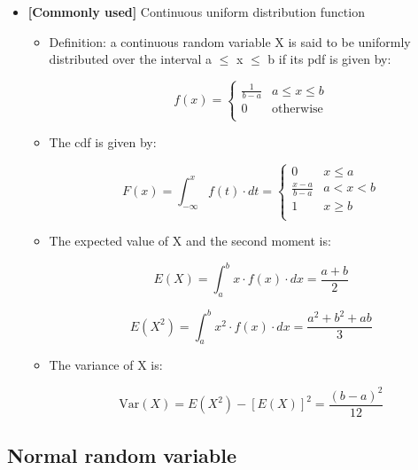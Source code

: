 \documentclass[12pt]{report}
\renewcommand{\_}{\kern-1.5pt\textunderscore\kern-1.5pt}
\begin{document}
\begin{itemize}
	\item \textbf{[Commonly used] }Continuous uniform distribution function\par

\begin{itemize}
	\item Definition: a continuous random variable X is said to be uniformly distributed over the interval a $ \leq $  x $ \leq $  b if its pdf is given by:\par

 \[ f \left( x \right) = \left\{ \begin{matrix}
\frac{1}{b-a}  &  a \leq x \leq b\\
0  &  \mathrm{otherwise}\\
\end{matrix}
  \] \par

	\item The cdf is given by:\par

 \[ F \left( x \right) = \int _{-\infty}^{x}f \left( t \right)  \cdot dt= \left\{ \begin{matrix}
0  &  x \leq a\\
\frac{x-a}{b-a}  &  a<x<b\\
1  &  x \geq b\\
\end{matrix}
  \] \par


\vspace{\baselineskip}
	\item The expected value of X and the second moment is:\par

 \[ E \left( X \right) = \int _{a}^{b}x \cdot f \left( x \right)  \cdot dx=\frac{a+b}{2} \] \par

 \[ E \left( X^{2} \right) = \int _{a}^{b}x^{2} \cdot f \left( x \right)  \cdot dx=\frac{a^{2}+b^{2}+ab}{3} \] \par

	\item The variance of X is:\par

 \[ \mathrm{Var} \left( X \right) =E \left( X^{2} \right) - \left[ E \left( X \right)  \right] ^{2}=\frac{ \left( b-a \right) ^{2}}{12} \] \par


\end{itemize}
\end{itemize}\subsection*{Normal random variable}
\end{document}
